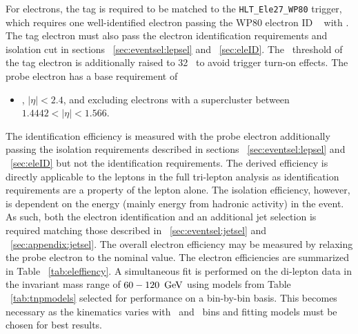 For electrons, the tag is required to be matched to the \verb=HLT_Ele27_WP80= trigger, which requires one well-identified electron passing the WP80 electron ID ~\cite{eleICHEP2012twiki} with \pt {} \GeV. The tag electron must also pass the electron identification requirements and isolation cut in sections ~\ref{sec:eventsel:lepsel} and ~\ref{sec:eleID}. The \pt \ threshold of the tag electron is additionally raised to 32 \GeV \ to avoid trigger turn-on effects. The probe electron has a base requirement of
\begin{itemize}
\item \pt {} \GeV, $|\eta| \lt 2.4$, and excluding electrons with a supercluster between $1.4442 \lt |\eta| \lt 1.566$.
\end{itemize}
The identification efficiency is measured with the probe electron additionally passing the isolation requirements described in sections ~\ref{sec:eventsel:lepsel} and ~\ref{sec:eleID} but not the identification requirements. The derived efficiency is directly applicable to the leptons in the full tri-lepton analysis as identification requirements are a property of the lepton alone. The isolation efficiency, however, is dependent on the energy (mainly energy from hadronic activity) in the event. As such, both the electron identification and an additional jet selection is required matching those described in ~\ref{sec:eventsel:jetsel} and ~\ref{sec:appendix:jetsel}. The overall electron efficiency may be measured by relaxing the probe electron to the nominal value. The electron efficiencies are summarized in Table ~\ref{tab:eleffiency}. A simultaneous fit is performed on the di-lepton data in the invariant mass range of $60-120 \ \,\text{Ge\hspace{-.08em}V}$ using models from Table ~\ref{tab:tnpmodels} selected for performance on a bin-by-bin basis. This becomes necessary as the kinematics varies with \pt \ and \aeta \ bins and fitting models must be chosen for best results.\\

